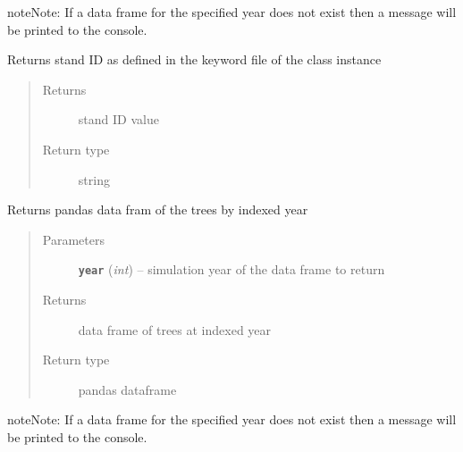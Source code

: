 \documentclass[letterpaper,10pt,english]{sphinxmanual}
\begin{document}
\begin{fulllineitems}
\begin{fulllineitems}
\begin{notice}{note}{Note:}
If a data frame for the specified year does not exist then
a message will be printed to the console.
\end{notice}

\end{fulllineitems}


\begin{fulllineitems}
\label{Fvsfuels:fuels.Fvsfuels.get_standid}
Returns stand ID as defined in the keyword file of the class instance
\begin{quote}\begin{description}
\item[{Returns}] \leavevmode
stand ID value

\item[{Return type}] \leavevmode
string

\end{description}\end{quote}

\end{fulllineitems}


\begin{fulllineitems}
\label{Fvsfuels:fuels.Fvsfuels.get_trees}
Returns pandas data fram of the trees by indexed year
\begin{quote}\begin{description}
\item[{Parameters}] \leavevmode
\textbf{\texttt{year}} (\emph{int}) -- simulation year of the data frame to return

\item[{Returns}] \leavevmode
data frame of trees at indexed year

\item[{Return type}] \leavevmode
pandas dataframe

\end{description}\end{quote}

\begin{notice}{note}{Note:}
If a data frame for the specified year does not exist then
a message will be printed to the console.
\end{notice}


\end{fulllineitems}
\end{fulllineitems}
\end{document}
